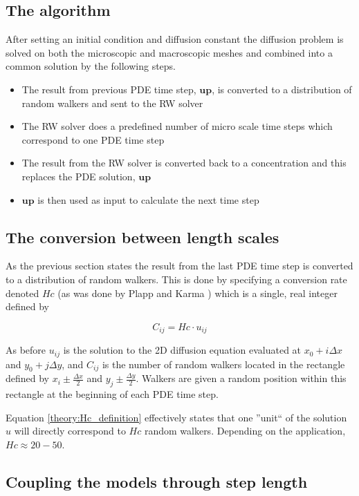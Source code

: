 \subsection{The algorithm}
After setting an initial condition and diffusion constant the diffusion problem is solved on both the microscopic and macroscopic meshes and combined into a common solution by the following steps.
\begin{itemize}
 \item The result from previous PDE time step, $\mathbf{up}$, is converted to a distribution of random walkers and sent to the RW solver
 \item The RW solver does a predefined number of micro scale time steps which correspond to one PDE time step
 \item The result from the RW solver is converted back to a concentration and this replaces the PDE solution, $\mathbf{up}$
 \item $\mathbf{up}$ is then used as input to calculate the next time step
\end{itemize}

\subsection{The conversion between length scales}
As the previous section states the result from the last PDE time step is converted to a distribution of random walkers. 
This is done by specifying a conversion rate denoted $Hc$ (as was done by Plapp and Karma \cite{plapp2000multiscale}) which is a single, real integer defined by

\begin{equation}\label{theory:Hc_definition}
 C_{ij} = Hc\cdot u_{ij}
\end{equation}

\noindent As before $u_{ij}$ is the solution to the 2D diffusion equation evaluated at $x_0 +i\Delta x$ and $y_0 +j\Delta y$, and $C_{ij}$ is the number of random walkers located in the rectangle defined by $x_i\pm\frac{\Delta x}{2}$ and $y_j\pm\frac{\Delta y}{2}$. 
Walkers are given a random position within this rectangle at the beginning of each PDE time step. 

Equation \eqref{theory:Hc_definition} effectively states that one ''unit`` of the solution $u$ will directly correspond to $Hc$ random walkers. Depending on the application, $Hc \approx 20-50$.

\subsection{Coupling the models through step length}

